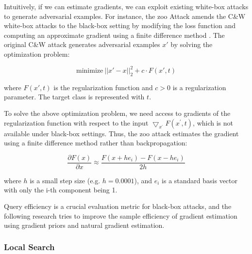 Intuitively, if we can estimate gradients, we can exploit existing white-box attacks to generate adversarial examples. For instance, the \acrfull{zoo} Attack amends the C\&W white-box attacks to the black-box setting by modifying the loss function and computing an approximate gradient using a finite difference method \citep{Chen_2017}. The original C\&W attack generates adversarial examples $x'$ by solving the optimization problem:

\begin{equation}
    \text{minimize}\ ||x'-x||^2_2 + c \cdot F(x', t)
\end{equation}

where $F(x', t)$ is the regularization function and $c>0$ is a regularization parameter. The target class is represented with $t$.

To solve the above optimization problem, we need access to gradients of the regularization function with respect to the input $\bigtriangledown_{x^{'}} F(x^{'}, t)$, which is not available under black-box settings. Thus, the \acrshort{zoo} attack estimates the gradient using a finite difference method rather than backpropagation:

\begin{equation}
    \frac{\partial F(x)}{\partial x} \approx \frac{F(x+he_i) - F(x-he_i)}{2h}
\end{equation}


where $h$ is a small step size (e.g. $h = 0.0001$), and $e_i$ is a standard basis vector with only the i-th component being 1.

Query efficiency is a crucial evaluation metric for black-box attacks, and the following research tries to improve the sample efficiency of gradient estimation using gradient priors and natural gradient estimation.



\subsubsection{Local Search}

